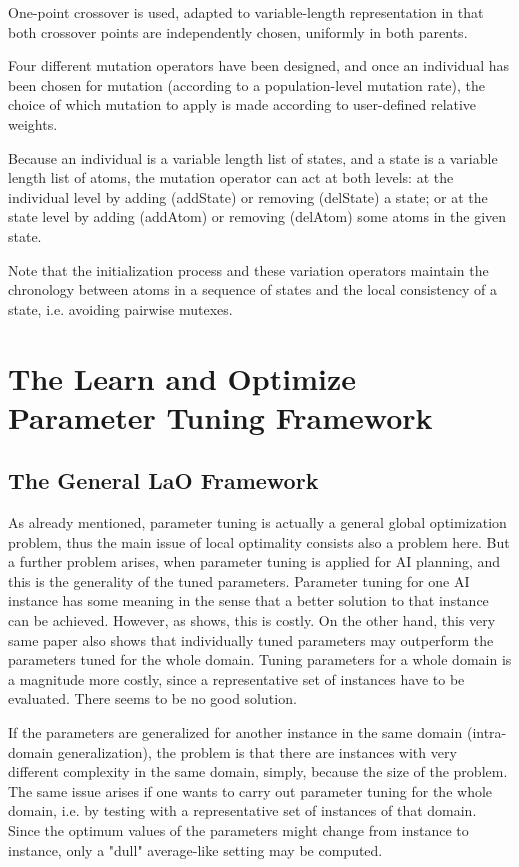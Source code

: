 \documentclass{acm_proc_article-sp}
\begin{document}
One-point crossover is used, adapted to variable-length representation in that both crossover points are independently chosen, uniformly in both parents.

Four different mutation operators have been designed, and once an individual has been chosen for mutation (according to a population-level mutation rate), the choice of which mutation to apply is made according to user-defined relative weights. 

Because an individual is a variable length list of states, and a state is a variable length list of atoms, the mutation 
operator can act at both levels: at the individual level by adding (addState) or removing (delState) 
a state; or at the state level by adding (addAtom) or removing (delAtom) some atoms in the given state. 

Note that the initialization process and these variation operators maintain the chronology between atoms in a sequence of states and the local consistency of a state, i.e. avoiding pairwise mutexes.

\section{The Learn and Optimize Parameter Tuning Framework}
\label{section:LaO}

\subsection{The General LaO Framework}

As already mentioned, parameter tuning is actually a general global optimization problem, thus the main issue of local optimality consists also a problem here. But a further problem arises, when parameter tuning is applied for AI planning, and this is the generality of the tuned parameters. Parameter tuning for one AI instance has some meaning in the sense that a better solution to that instance can be achieved. However, as \cite{BibGECCO:2010} shows, this is costly. On the other hand, this very same paper also shows that individually tuned parameters may outperform the parameters tuned for the whole domain. Tuning parameters for a whole domain is a magnitude more costly, since a representative set of instances have to be evaluated. There seems to be no good solution.

If the parameters are generalized for another instance in the same domain (intra-domain generalization), the problem is that there are instances with very different complexity in the same domain, simply, because the size of the problem. The same issue arises if one wants to carry out parameter tuning for the whole domain, i.e. by testing with a representative set of instances of that domain. Since the optimum values of the parameters might change from instance to instance, only a "dull" average-like setting may be computed.
\end{document}
